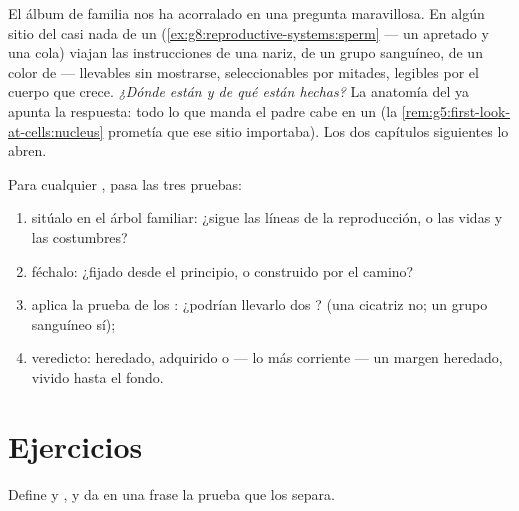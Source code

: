 \begin{remark}\label{rem:g9:heredity-and-traits:question}
El álbum de familia nos ha acorralado en una pregunta maravillosa. En
algún sitio del casi nada de un 
(\cref{ex:g8:reproductive-systems:sperm} --- un  apretado y una
cola) viajan las instrucciones de una nariz, de un grupo sanguíneo, de
un color de  --- llevables sin mostrarse, seleccionables por
mitades, legibles por el cuerpo que crece. \emph{¿Dónde están y de qué
están hechas?} La anatomía del  ya apunta la respuesta:
todo lo que manda el padre cabe en un  (la
\cref{rem:g5:first-look-at-cells:nucleus} prometía que ese sitio
importaba). Los dos capítulos siguientes lo abren.
\end{remark}

\begin{method}\label{met:g9:heredity-and-traits:audit}
Para cualquier , pasa las tres pruebas:
\begin{enumerate}
  \item sitúalo en el árbol familiar: ¿sigue las líneas de la
        reproducción, o las vidas y las costumbres?
  \item féchalo: ¿fijado desde el principio, o construido por el
        camino?
  \item aplica la prueba de los : ¿podrían llevarlo dos ?
        (una cicatriz no; un grupo sanguíneo sí);
  \item veredicto: heredado, adquirido o --- lo más corriente --- un
        margen heredado, vivido hasta el fondo.
\end{enumerate}
\end{method}

\section{Ejercicios}

\begin{exercise}[$\star$]\label{exo:g9:heredity-and-traits:1}
Define  y , y da en una frase la prueba que los separa.
\end{exercise}

